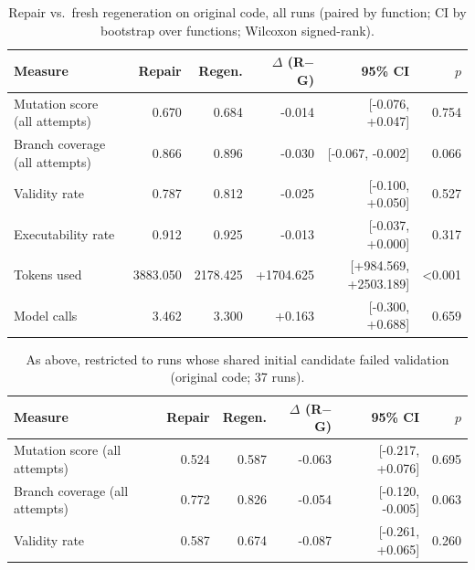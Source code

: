 \begin{table}[t]
\centering\small
\caption{Repair vs.\ fresh regeneration on original code, all runs (paired by function; CI by bootstrap over functions; Wilcoxon signed-rank).}
\label{tab:main-original}
\begin{tabular}{lrrrrr}
\toprule
Measure & Repair & Regen. & $\Delta$ (R$-$G) & 95\% CI & $p$ \\
\midrule
Mutation score (all attempts) & 0.670 & 0.684 & -0.014 & [-0.076, +0.047] & 0.754 \\
Branch coverage (all attempts) & 0.866 & 0.896 & -0.030 & [-0.067, -0.002] & 0.066 \\
Validity rate & 0.787 & 0.812 & -0.025 & [-0.100, +0.050] & 0.527 \\
Executability rate & 0.912 & 0.925 & -0.013 & [-0.037, +0.000] & 0.317 \\
Tokens used & 3883.050 & 2178.425 & +1704.625 & [+984.569, +2503.189] & <0.001 \\
Model calls & 3.462 & 3.300 & +0.163 & [-0.300, +0.688] & 0.659 \\
\bottomrule
\end{tabular}
\end{table}

\begin{table}[t]
\centering\small
\caption{As above, restricted to runs whose shared initial candidate failed validation (original code; 37 runs).}
\label{tab:fail-original}
\begin{tabular}{lrrrrr}
\toprule
Measure & Repair & Regen. & $\Delta$ (R$-$G) & 95\% CI & $p$ \\
\midrule
Mutation score (all attempts) & 0.524 & 0.587 & -0.063 & [-0.217, +0.076] & 0.695 \\
Branch coverage (all attempts) & 0.772 & 0.826 & -0.054 & [-0.120, -0.005] & 0.063 \\
Validity rate & 0.587 & 0.674 & -0.087 & [-0.261, +0.065] & 0.260 \\
\bottomrule
\end{tabular}
\end{table}

